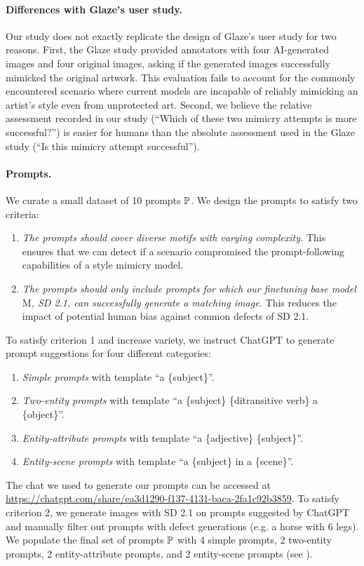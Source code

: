 \documentclass{article}
\newcommand{\model}[1]{\mathrm{#1}}
\begin{document}
\paragraph{Differences with Glaze's user study.} Our study does not exactly replicate the design of Glaze's user study for two reasons. First, the Glaze study provided annotators with four AI-generated images and four original images, asking if the generated images successfully mimicked the original artwork. This evaluation fails to account for the commonly encountered scenario where current models are incapable of reliably mimicking an artist's style even from unprotected art. Second, we believe the relative assessment recorded in our study (``Which of these two mimicry attempts is more successful?'') is easier for humans than the absolute assessment used in the Glaze study (``Is this mimicry attempt successful'').


\paragraph{Prompts.}\label{ap:prompts}

We curate a small dataset of 10 prompts ${\mathbb{P}}$. We design the prompts to satisfy two criteria:
\begin{enumerate}
    \item \textit{The prompts should cover diverse motifs with varying complexity.} This  ensures that we can detect if a scenario compromised the prompt-following capabilities of a style mimicry model.
    \item \textit{The prompts should only include prompts for which our finetuning base model $\model{M}$, SD 2.1, can successfully generate a matching image.}  This reduces the impact of potential human bias against common defects of SD 2.1.
\end{enumerate}
To satisfy criterion 1 and increase variety, we instruct ChatGPT to generate prompt suggestions for four different categories:
\begin{enumerate}
    \item \textit{Simple prompts} with template ``a \{subject\}''.
    \item \textit{Two-entity prompts} with template ``a \{subject\} \{ditransitive verb\} a \{object\}''.
    \item \textit{Entity-attribute prompts} with template ``a \{adjective\} \{subject\}''.
    \item \textit{Entity-scene prompts} with template ``a \{subject\} in a \{scene\}''.
\end{enumerate}
The chat we used to generate our prompts can be accessed at \url{https://chatgpt.com/share/ea3d1290-f137-4131-baca-2fa1c92b3859}. To satisfy criterion 2, we generate images with SD 2.1 on prompts suggested by ChatGPT and manually filter out
prompts with defect generations (e.g. a horse with 6 legs). We populate the final set of prompts ${\mathbb{P}}$ with 4
simple prompts, 2 two-entity prompts, 2 entity-attribute prompts,
and 2 entity-scene prompts (see ).
\end{document}
